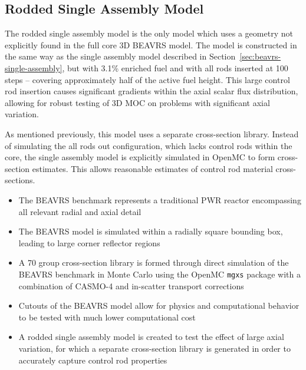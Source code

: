 \subsection{Rodded Single Assembly Model}
\label{sec:rodded-single-assembly}

The rodded single assembly model is the only model which uses a geometry not explicitly found in the full core 3D BEAVRS model. The model is constructed in the same way as the single assembly model described in Section~\ref{sec:beavrs-single-assembly}, but with 3.1\% enriched fuel and with all rods inserted at 100 steps -- covering approximately half of the active fuel height. This large control rod insertion causes significant gradients within the axial scalar flux distribution, allowing for robust testing of 3D \ac{MOC} on problems with significant axial variation.

As mentioned previously, this model uses a separate cross-section library. Instead of simulating the all rods out configuration, which lacks control rods within the core, the single assembly model is explicitly simulated in OpenMC to form cross-section estimates. This allows reasonable estimates of control rod material cross-sections.


\newpage
\vfill
\begin{highlightsbox}[frametitle=Highlights]
	\begin{itemize}
		\item The BEAVRS benchmark represents a traditional \ac{PWR} reactor encompassing all relevant radial and axial detail
		\item The BEAVRS model is simulated within a radially square bounding box, leading to large corner reflector regions
		\item A 70 group cross-section library is formed through direct simulation of the BEAVRS benchmark in Monte Carlo using the OpenMC \texttt{mgxs} package with a combination of CASMO-4 and in-scatter transport corrections
		\item Cutouts of the BEAVRS model allow for physics and computational behavior to be tested with much lower computational cost
		\item A rodded single assembly model is created to test the effect of large axial variation, for which a separate cross-section library is generated in order to accurately capture control rod properties
		
	\end{itemize}
\end{highlightsbox}
\vfill


